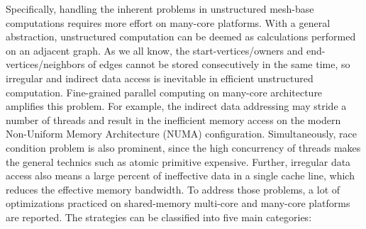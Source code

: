 \documentclass[5p,times]{elsarticle}
\begin{document}
Specifically, handling the inherent problems in unstructured mesh-base computations requires more effort on many-core platforms. With a general abstraction, unstructured computation can be deemed as calculations performed on an adjacent graph. As we all know, the start-vertices/owners and end-vertices/neighbors of edges cannot be stored consecutively in the same time, so irregular and indirect data access is inevitable in efficient unstructured computation. Fine-grained parallel computing on many-core architecture amplifies this problem. For example, the indirect data addressing may stride a number of threads and result in the inefficient memory access on the modern Non-Uniform Memory Architecture (NUMA) configuration\cite{b4}. Simultaneously, race condition problem is also prominent, since the high concurrency of threads makes the general technics such as atomic primitive expensive\cite{b6}\cite{b6-6}. Further, irregular data access also means a large percent of ineffective data in a single cache line\cite{b7}\cite{b8-8}\cite{b9-9}, which reduces the effective memory bandwidth. To address those problems, a lot of optimizations practiced on shared-memory multi-core and many-core platforms are reported. The strategies can be classified into five main categories:
\end{document}
